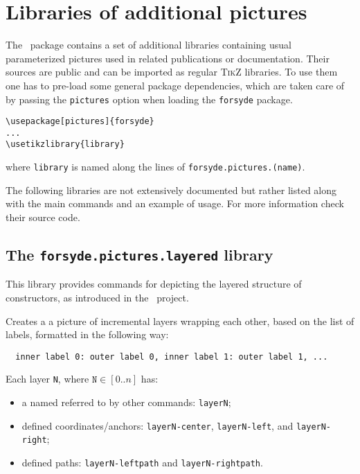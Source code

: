 \section{Libraries of additional pictures}
\label{sec:forsyde-pictures}

The \ForSyDeLaTeX\ package contains a set of additional libraries containing usual parameterized pictures used in related publications or documentation. Their sources are public and can be imported as regular \textsc{TikZ} libraries. To use them one has to pre-load some general package dependencies, which are taken care of by passing the \texttt{pictures} option when loading the \texttt{forsyde} package.
%
\begin{verbatim}
\usepackage[pictures]{forsyde}
...
\usetikzlibrary{library}
\end{verbatim}
%
\noindent where \texttt{library} is named along the lines of \texttt{forsyde.pictures.(name)}.

The following libraries are not extensively documented but rather listed along with the main commands and an example of usage. For more information check their source code.

\subsection{The \texttt{forsyde.pictures.layered} library}
\label{sec:forsyde-pictures-layered}

This library provides commands for depicting the layered structure of constructors, as introduced in the \ForSyDeAtom\ project.

\vspace{1ex}
\hspace{1pt}

\noindent Creates a a picture of incremental layers wrapping each other, based on the list of labels, formatted in the following way:
%
\begin{verbatim}
  inner label 0: outer label 0, inner label 1: outer label 1, ...
\end{verbatim}
%
Each layer \texttt{N}, where $\mathtt{N} \in [0..n]$ has:

\begin{itemize}
\item a named referred to by other commands: \texttt{layerN};
\item defined coordinates/anchors: \texttt{layerN-center}, \texttt{layerN-left}, and \texttt{layerN-right};
\item defined paths: \texttt{layerN-leftpath} and \texttt{layerN-rightpath}.
\end{itemize}

